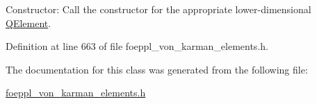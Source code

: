 Constructor\+: Call the constructor for the appropriate lower-\/dimensional \hyperlink{classoomph_1_1QElement}{Q\+Element}. 



Definition at line 663 of file foeppl\+\_\+von\+\_\+karman\+\_\+elements.\+h.



The documentation for this class was generated from the following file\+:\begin{DoxyCompactItemize}
\item 
\hyperlink{foeppl__von__karman__elements_8h}{foeppl\+\_\+von\+\_\+karman\+\_\+elements.\+h}\end{DoxyCompactItemize}
